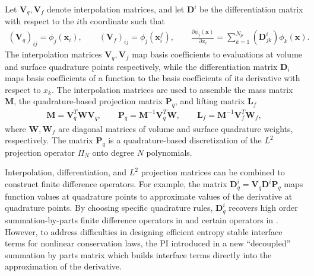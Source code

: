 \documentclass[review]{siamart0216}
\theoremstyle{assumption}
\newcommand{\pd}[2]{\frac{\partial#1}{\partial#2}}
\newcommand{\LRp}[1]{\left( #1 \right)}
\begin{document}
Let $\bm{V}_q,\bm{V}_f$ denote interpolation matrices, and let $\bm{D}^i$ be the differentiation matrix with respect to the $i$th coordinate such that
\begin{gather}
\LRp{\bm{V}_q}_{ij} = \phi_j(\bm{x}_i), \qquad \LRp{\bm{V}_f}_{ij} = \phi_j(\bm{x}^f_i), \qquad \pd{\phi_j(\bm{x})}{x_i} = \sum_{k=1}^{N_p} \LRp{\bm{D}^i_{jk}} \phi_k(\bm{x}).
\end{gather}
The interpolation matrices $\bm{V}_q,\bm{V}_f$ map basis coefficients to evaluations at volume and surface quadrature points respectively, while the differentiation matrix ${\bm{D}}_i$ maps basis coefficients of a function to the basis coefficients of its derivative with respect to $x_k$.  The interpolation matrices are used to assemble the mass matrix $\bm{M}$, the quadrature-based projection matrix $\bm{P}_q$, and lifting matrix $\bm{L}_f$
\begin{gather}
\bm{M} = \bm{V}_q^T\bm{W}\bm{V}_q, \qquad \bm{P}_q = \bm{M}^{-1}\bm{V}_q^T\bm{W}, \qquad \bm{L}_f = \bm{M}^{-1}\bm{V}_f^T\bm{W}_f,
\end{gather}
where $\bm{W}, \bm{W}_f$ are diagonal matrices of volume and surface quadrature weights, respectively.  The matrix $\bm{P}_q$ is a quadrature-based discretization of the $L^2$ projection operator $\Pi_N$ onto degree $N$ polynomials.

Interpolation, differentiation, and $L^2$ projection matrices can be combined to construct finite difference operators.  For example, the matrix $\bm{D}^i_q = \bm{V}_q\bm{D}^i\bm{P}_q$ maps function values at quadrature points to approximate values of the derivative at quadrature points.  By choosing specific quadrature rules, $\bm{D}^i_q$ recovers high order summation-by-parts finite difference operators in \cite{gassner2013skew, fernandez2014generalized, ranocha2018generalised} and certain operators in \cite{hicken2016multidimensional}.  However, to address difficulties in designing efficient entropy stable interface terms for nonlinear conservation laws, the PI introduced in \cite{chan2017discretely} a new ``decoupled'' summation by parts matrix which builds interface terms directly into the approximation of the derivative.  
\end{document}
